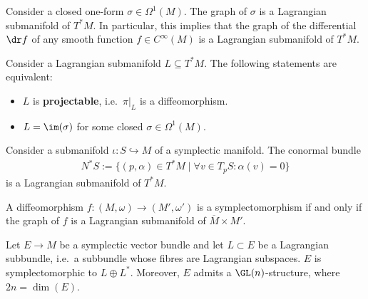     \begin{example}\label{symplectic:closed_section_submanifold}
        Consider a closed one-form $\sigma\in\Omega^1(M)$. The graph of $\sigma$ is a Lagrangian submanifold of $T^*M$. In particular, this implies that the graph of the differential $\dr f$ of any smooth function $f\in C^\infty(M)$ is a Lagrangian submanifold of $T^*M$.
    \end{example}
    \begin{property}\label{symplectic:projectable_lagrangians}
        Consider a Lagrangian submanifold $L\subseteq T^*M$. The following statements are equivalent:
        \begin{itemize}
            \item $L$ is \textbf{projectable}, i.e.~$\pi|_L$ is a diffeomorphism.
            \item $L=\im(\sigma)$ for some closed $\sigma\in\Omega^1(M)$.
        \end{itemize}
    \end{property}

    \begin{example}
        Consider a submanifold $\iota:S\hookrightarrow M$ of a symplectic manifold. The conormal bundle
        \begin{gather}
            N^*S := \{(p,\alpha)\in T^*M\mid\forall v\in T_pS:\alpha(v)=0\}
        \end{gather}
        is a Lagrangian submanifold of $T^*M$.
    \end{example}

    \begin{property}[Symplectomorphisms]
        A diffeomorphism $f:(M,\omega)\rightarrow(M',\omega')$ is a symplectomorphism if and only if the graph of $f$ is a Lagrangian submanifold of $\overline{M}\times M'$.
    \end{property}

    \begin{property}
        Let $E\rightarrow M$ be a symplectic vector bundle and let $L\subset E$ be a Lagrangian subbundle, i.e.~a subbundle whose fibres are Lagrangian subspaces. $E$ is symplectomorphic to $L\oplus L^*$. Moreover, $E$ admits a $\GL(n)$-structure, where $2n=\dim(E)$.
    \end{property}

